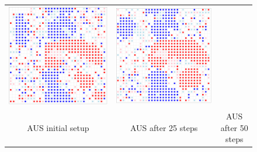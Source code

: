 \documentclass[12pt, a4paper]{article}
\begin{document}
\begin{figure}[H]
\begin{tabular}{ccc}
			\includegraphics[scale=0.35]{Plots/US_step25.PNG} &
			\includegraphics[scale=0.35]{Plots/US_step50.PNG} \\
			AUS initial setup & AUS after 25 steps & AUS after 50 steps \\

\end{tabular}
\end{figure}
\end{document}
